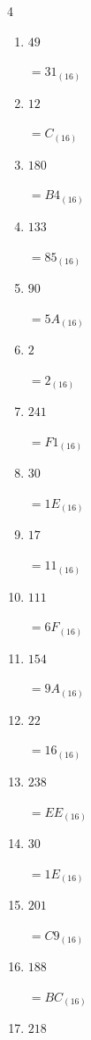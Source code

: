 \begin{multicols}{4}
\begin{enumerate}
  \item $49$

        $=31_{(16)}$

  \item $12$

        $=C_{(16)}$

  \item $180$

        $=B4_{(16)}$

  \item $133$

        $=85_{(16)}$

  \item $90$

        $=5A_{(16)}$

  \item $2$

        $=2_{(16)}$

\columnbreak %

  \item $241$

        $=F1_{(16)}$

  \item $30$

        $=1E_{(16)}$

  \item $17$

        $=11_{(16)}$

  \item $111$

        $=6F_{(16)}$

  \item $154$

        $=9A_{(16)}$

  \item $22$

        $=16_{(16)}$

  \item $238$

        $=EE_{(16)}$

  \item $30$

        $=1E_{(16)}$

  \item $201$

        $=C9_{(16)}$

  \item $188$

        $=BC_{(16)}$

  \item $218$


\end{enumerate}
\end{multicols}
